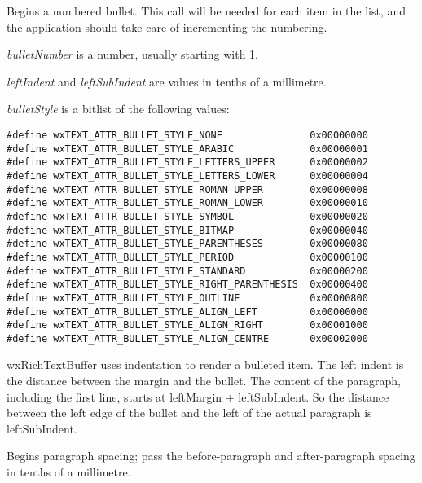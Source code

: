 Begins a numbered bullet. This call will be needed for each item in the list, and the
application should take care of incrementing the numbering.

{\it bulletNumber} is a number, usually starting with 1.

{\it leftIndent} and {\it leftSubIndent} are values in tenths of a millimetre.

{\it bulletStyle} is a bitlist of the following values:

{\small
\begin{verbatim}
#define wxTEXT_ATTR_BULLET_STYLE_NONE               0x00000000
#define wxTEXT_ATTR_BULLET_STYLE_ARABIC             0x00000001
#define wxTEXT_ATTR_BULLET_STYLE_LETTERS_UPPER      0x00000002
#define wxTEXT_ATTR_BULLET_STYLE_LETTERS_LOWER      0x00000004
#define wxTEXT_ATTR_BULLET_STYLE_ROMAN_UPPER        0x00000008
#define wxTEXT_ATTR_BULLET_STYLE_ROMAN_LOWER        0x00000010
#define wxTEXT_ATTR_BULLET_STYLE_SYMBOL             0x00000020
#define wxTEXT_ATTR_BULLET_STYLE_BITMAP             0x00000040
#define wxTEXT_ATTR_BULLET_STYLE_PARENTHESES        0x00000080
#define wxTEXT_ATTR_BULLET_STYLE_PERIOD             0x00000100
#define wxTEXT_ATTR_BULLET_STYLE_STANDARD           0x00000200
#define wxTEXT_ATTR_BULLET_STYLE_RIGHT_PARENTHESIS  0x00000400
#define wxTEXT_ATTR_BULLET_STYLE_OUTLINE            0x00000800
#define wxTEXT_ATTR_BULLET_STYLE_ALIGN_LEFT         0x00000000
#define wxTEXT_ATTR_BULLET_STYLE_ALIGN_RIGHT        0x00001000
#define wxTEXT_ATTR_BULLET_STYLE_ALIGN_CENTRE       0x00002000
\end{verbatim}
}

wxRichTextBuffer uses indentation to render a bulleted item. The left indent is the distance between
the margin and the bullet. The content of the paragraph, including the first line, starts
at leftMargin + leftSubIndent. So the distance between the left edge of the bullet and the
left of the actual paragraph is leftSubIndent.

\label{wxrichtextbufferbeginparagraphspacing}


Begins paragraph spacing; pass the before-paragraph and after-paragraph spacing in tenths of
a millimetre.

\label{wxrichtextbufferbeginparagraphstyle}


